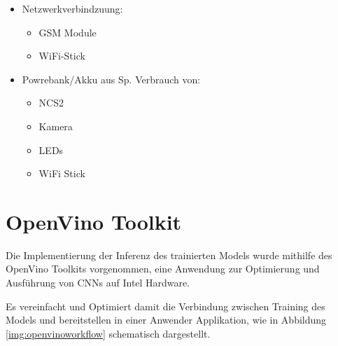

\begin{itemize}
    \item Netzwerkverbindzuung:
    \begin{itemize}
        \item GSM Module
        \item WiFi-Stick
    \end{itemize}
    \item Powrebank/Akku aus Sp. Verbrauch von:
    \begin{itemize}
        \item NCS2
        \item Kamera
        \item LEDs
        \item WiFi Stick
    \end{itemize}
\end{itemize}






\section{OpenVino Toolkit}\label{sec:openvino}


Die Implementierung der Inferenz des trainierten Models wurde 
mithilfe des OpenVino Toolkits vorgenommen, eine Anwendung 
zur Optimierung und Ausführung von CNNs auf Intel Hardware.

Es vereinfacht und Optimiert damit die Verbindung zwischen 
Training des Models und bereitstellen in einer Anwender 
Applikation, wie in Abbildung \ref{img:openvinoworkflow} 
schematisch dargestellt.

